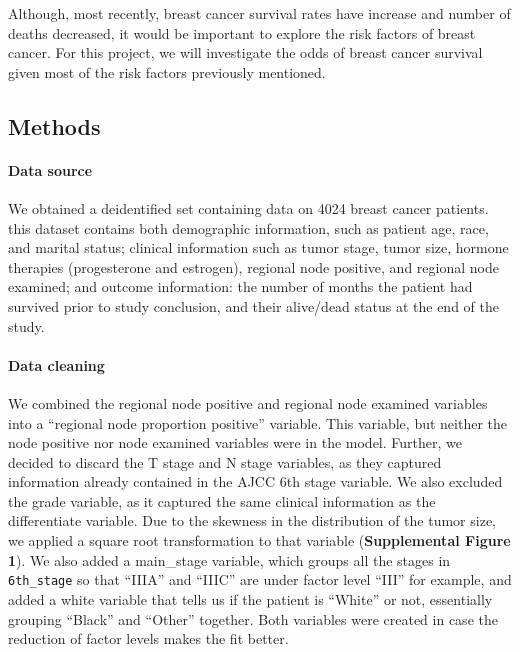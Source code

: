 \documentclass[]{article}
\let\oldparagraph\paragraph
\renewcommand{\paragraph}[1]{\oldparagraph{#1}\mbox{}}
\begin{document}
Although, most recently, breast cancer survival rates have increase and
number of deaths decreased, it would be important to explore the risk
factors of breast cancer. For this project, we will investigate the odds
of breast cancer survival given most of the risk factors previously
mentioned.

\hypertarget{methods}{%
\subsection{Methods}\label{methods}}

\hypertarget{data-source}{%
\paragraph{Data source}\label{data-source}}

We obtained a deidentified set containing data on 4024 breast cancer
patients. this dataset contains both demographic information, such as
patient age, race, and marital status; clinical information such as
tumor stage, tumor size, hormone therapies (progesterone and estrogen),
regional node positive, and regional node examined; and outcome
information: the number of months the patient had survived prior to
study conclusion, and their alive/dead status at the end of the study.

\hypertarget{data-cleaning}{%
\paragraph{Data cleaning}\label{data-cleaning}}

We combined the regional node positive and regional node examined
variables into a ``regional node proportion positive'' variable. This
variable, but neither the node positive nor node examined variables were
in the model. Further, we decided to discard the T stage and N stage
variables, as they captured information already contained in the AJCC
6th stage variable. We also excluded the grade variable, as it captured
the same clinical information as the differentiate variable. Due to the
skewness in the distribution of the tumor size, we applied a square root
transformation to that variable (\textbf{Supplemental Figure 1}). We
also added a main\_stage variable, which groups all the stages in
\texttt{6th\_stage} so that ``IIIA'' and ``IIIC'' are under factor level
``III'' for example, and added a white variable that tells us if the
patient is ``White'' or not, essentially grouping ``Black'' and
``Other'' together. Both variables were created in case the reduction of
factor levels makes the fit better.
\end{document}
